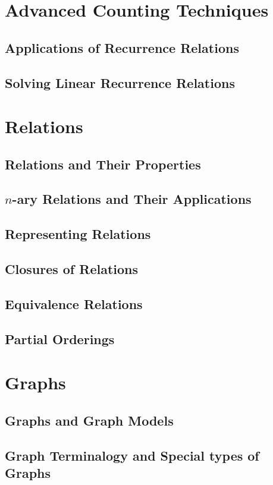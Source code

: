 \documentclass[12pt]{article}
\begin{document}
    \section{Advanced Counting Techniques}
    \subsection{Applications of Recurrence Relations}
    \subsection{Solving Linear Recurrence Relations}

    \section{Relations}
    \subsection{Relations and Their Properties}
    \subsection{$n$-ary Relations and Their Applications}
    \subsection{Representing Relations}
    \subsection{Closures of Relations}
    \subsection{Equivalence Relations}
    \subsection{Partial Orderings}

    \section{Graphs}
    \subsection{Graphs and Graph Models}
    \subsection{Graph Terminalogy and Special types of Graphs}
\end{document}
